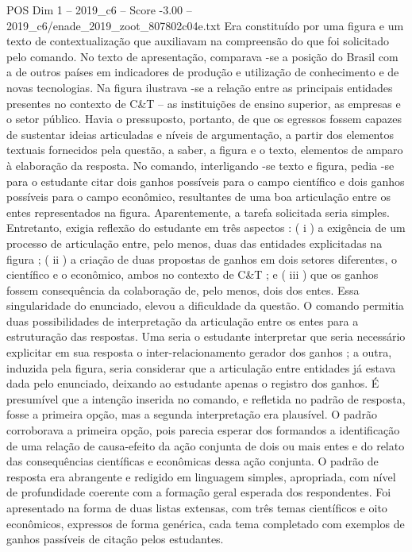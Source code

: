 \begin{textsample}{POS Dim 1 – 2019\_c6 – Score -3.00 – 2019\_c6/enade\_2019\_zoot\_807802c04e.txt}
Era constituído por uma figura e um texto de contextualização que auxiliavam na compreensão do que foi solicitado pelo comando.
No texto de apresentação, comparava -se a posição do Brasil com a de outros países em indicadores de produção e utilização de conhecimento e de novas tecnologias.
Na figura ilustrava -se a relação entre as principais entidades presentes no contexto de C\&T – as instituições de ensino superior, as empresas e o setor público.
Havia o pressuposto, portanto, de que os egressos fossem capazes de sustentar ideias articuladas e níveis de argumentação, a partir dos elementos textuais fornecidos pela questão, a saber, a figura e o texto, elementos de amparo à elaboração da resposta.
No comando, interligando -se texto e figura, pedia -se para o estudante citar dois ganhos possíveis para o campo científico e dois ganhos possíveis para o campo econômico, resultantes de uma boa articulação entre os entes representados na figura.
Aparentemente, a tarefa solicitada seria simples.
Entretanto, exigia reflexão do estudante em três aspectos : ( i ) a exigência de um processo de articulação entre, pelo menos, duas das entidades explicitadas na figura ; ( ii ) a criação de duas propostas de ganhos em dois setores diferentes, o científico e o econômico, ambos no contexto de C\&T ; e ( iii ) que os ganhos fossem consequência da colaboração de, pelo menos, dois dos entes.
Essa singularidade do enunciado, elevou a dificuldade da questão.
O comando permitia duas possibilidades de interpretação da articulação entre os entes para a estruturação das respostas.
Uma seria o estudante interpretar que seria necessário explicitar em sua resposta o inter-relacionamento gerador dos ganhos ; a outra, induzida pela figura, seria considerar que a articulação entre entidades já estava dada pelo enunciado, deixando ao estudante apenas o registro dos ganhos.
É presumível que a intenção inserida no comando, e refletida no padrão de resposta, fosse a primeira opção, mas a segunda interpretação era plausível.
O padrão corroborava a primeira opção, pois parecia esperar dos formandos a identificação de uma relação de causa-efeito da ação conjunta de dois ou mais entes e do relato das consequências científicas e econômicas dessa ação conjunta.
O padrão de resposta era abrangente e redigido em linguagem simples, apropriada, com nível de profundidade coerente com a formação geral esperada dos respondentes.
Foi apresentado na forma de duas listas extensas, com três temas científicos e oito econômicos, expressos de forma genérica, cada tema completado com exemplos de ganhos passíveis de citação pelos estudantes.

\end{textsample}
